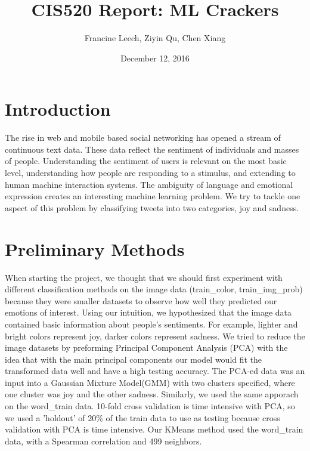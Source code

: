 \documentclass[]{article}
\begin{document}
\title{CIS520 Report: ML Crackers}   %
\author{Francine Leech, Ziyin Qu, Chen Xiang}         %
\date{December 12, 2016}    %
\maketitle

\section{Introduction}

The rise in web and mobile based social networking has opened a stream of continuous text data. These data reflect the sentiment of individuals and masses of people. Understanding the sentiment of users is relevant on the most basic level, understanding how people are responding to a stimulus, and extending to human machine interaction systems. The ambiguity of language and emotional expression creates an interesting machine learning problem.  We try to tackle one aspect of this problem by classifying tweets into two categories, joy and sadness. 

\section{Preliminary Methods}

When starting the project, we thought that we should first experiment with different classification methods on the image data (train\_color, train\_img\_prob) because they were smaller datasets to observe how well they predicted our emotions of interest. Using our intuition, we hypothesized that the image data contained basic information about people's sentiments. For example, lighter and bright colors represent joy, darker colors represent sadness. We tried to reduce the image datasets by preforming Principal Component Analysis (PCA) with the idea that with the main principal components our model would fit the transformed data well and have a high testing accuracy. The PCA-ed data was an input into a Gaussian Mixture Model(GMM) with two clusters specified, where one cluster was joy and the other sadness. Similarly, we used the same apporach on the word\_train data. 10-fold cross validation is time intensive with PCA, so we used a 'holdout' of 20\% of the train data to use as testing because cross validation with PCA is time intensive. Our KMeans method used the word\_train data, with a Spearman correlation and 499 neighbors. \\
\end{document}
